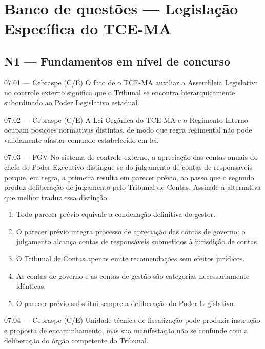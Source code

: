 \section{Banco de questões — Legislação Específica do TCE-MA}

\subsection*{N1 — Fundamentos em nível de concurso}

\begin{questao}{ 07.01 — Cebraspe (C/E)}
O fato de o TCE-MA auxiliar a Assembleia Legislativa no controle externo significa que o Tribunal se encontra hierarquicamente subordinado ao Poder Legislativo estadual.
\end{questao}

\begin{questao}{ 07.02 — Cebraspe (C/E)}
A Lei Orgânica do TCE-MA e o Regimento Interno ocupam posições normativas distintas, de modo que regra regimental não pode validamente afastar comando estabelecido em lei.
\end{questao}

\begin{questao}{ 07.03 — FGV}
No sistema de controle externo, a apreciação das contas anuais do chefe do Poder Executivo distingue-se do julgamento de contas de responsáveis porque, em regra, a primeira resulta em parecer prévio, ao passo que o segundo produz deliberação de julgamento pelo Tribunal de Contas. Assinale a alternativa que melhor traduz essa distinção.
\begin{enumerate}[label=\Alph*)]
\item Todo parecer prévio equivale a condenação definitiva do gestor.
\item O parecer prévio integra processo de apreciação das contas de governo; o julgamento alcança contas de responsáveis submetidos à jurisdição de contas.
\item O Tribunal de Contas apenas emite recomendações sem efeitos jurídicos.
\item As contas de governo e as contas de gestão são categorias necessariamente idênticas.
\item O parecer prévio substitui sempre a deliberação do Poder Legislativo.
\end{enumerate}
\end{questao}

\begin{questao}{ 07.04 — Cebraspe (C/E)}
Unidade técnica de fiscalização pode produzir instrução e proposta de encaminhamento, mas sua manifestação não se confunde com a deliberação do órgão competente do Tribunal.
\end{questao}

